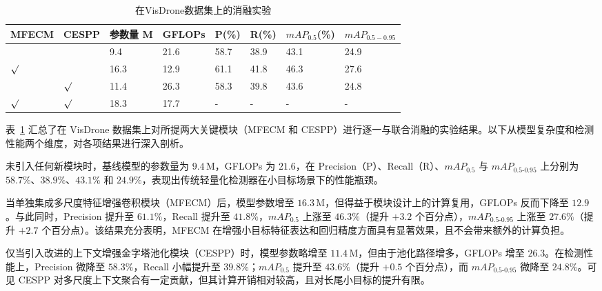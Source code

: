 \documentclass[runningheads]{llncs}
\begin{document}
\begin{table}[htbp]
    \centering
    \caption{在VisDrone数据集上的消融实验}
    \label{tab:ablation_studies_vd}
    \begin{tabular}{p{}p{}p{}p{}p{}p{}p{}p{}}
        \toprule
        MFECM   & CESPP   & 参数量 M & GFLOPs & P(\%) & R(\%)  & $mAP_{0.5}$(\%) & $mAP_{0.5-0.95}$ \\ 
        \midrule
                &         & 9.4     & 21.6   & 58.7  & 38.9   & 43.1            & 24.9             \\
        $\surd$ &         & 16.3    & 12.9   & 61.1  & 41.8   & 46.3            & 27.6             \\
                & $\surd$ & 11.4    & 26.3   & 58.3  & 39.8   & 43.6            & 24.8             \\
        $\surd$ & $\surd$ & 18.3    & 17.7   & -  & -   & -            & -             \\
        \bottomrule
    \end{tabular}
\end{table}

表~\ref{tab:ablation_studies_vd} 汇总了在 VisDrone 数据集上对所提两大关键模块（MFECM 和 CESPP）进行逐一与联合消融的实验结果。以下从模型复杂度和检测性能两个维度，对各项结果进行深入剖析。

未引入任何新模块时，基线模型的参数量为 $9.4\,\mathrm{M}$，GFLOPs 为 $21.6$，在 Precision（P）、Recall（R）、$mAP_{0.5}$ 与 $mAP_{0.5\text{-}0.95}$ 上分别为 $58.7\%$、$38.9\%$、$43.1\%$ 和 $24.9\%$，表现出传统轻量化检测器在小目标场景下的性能瓶颈。

当单独集成多尺度特征增强卷积模块（MFECM）后，模型参数增至 $16.3\,\mathrm{M}$，但得益于模块设计上的计算复用，GFLOPs 反而下降至 $12.9$。与此同时，Precision 提升至 $61.1\%$，Recall 提升至 $41.8\%$，$mAP_{0.5}$ 上涨至 $46.3\%$（提升 $+3.2$ 个百分点），$mAP_{0.5\text{-}0.95}$ 上涨至 $27.6\%$（提升 $+2.7$ 个百分点）。该结果充分表明，MFECM 在增强小目标特征表达和回归精度方面具有显著效果，且不会带来额外的计算负担。

仅当引入改进的上下文增强金字塔池化模块（CESPP）时，模型参数略增至 $11.4\,\mathrm{M}$，但由于池化路径增多，GFLOPs 增至 $26.3$。在检测性能上，Precision 微降至 $58.3\%$，Recall 小幅提升至 $39.8\%$；$mAP_{0.5}$ 提升至 $43.6\%$（提升 $+0.5$ 个百分点），而 $mAP_{0.5\text{-}0.95}$ 微降至 $24.8\%$。可见 CESPP 对多尺度上下文聚合有一定贡献，但其计算开销相对较高，且对长尾小目标的提升有限。
\end{document}
